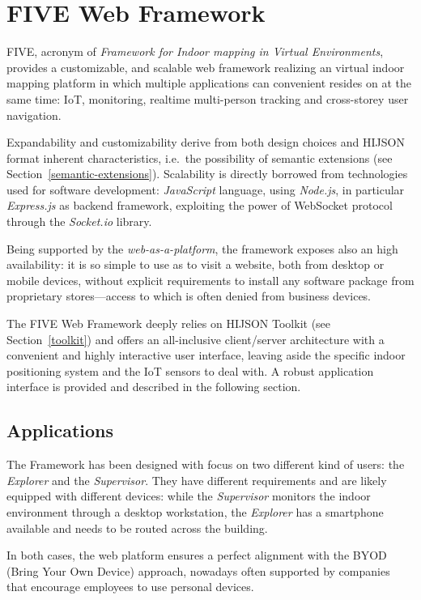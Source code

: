 \section{FIVE Web Framework}\label{framework}

FIVE, acronym of \emph{Framework for Indoor mapping in Virtual Environments},
provides a customizable, and scalable web framework realizing an virtual
indoor mapping platform in which multiple applications can convenient resides
on at the same time: IoT,  monitoring, realtime multi-person tracking and
cross-storey user navigation.

Expandability and customizability derive from both design choices and
HIJSON format inherent characteristics, i.e.~the possibility of semantic extensions (see Section~\ref{semantic-extensions}).
Scalability is directly borrowed from technologies used for
software development: \emph{JavaScript} language, using \emph{Node.js},
in particular \emph{Express.js} as backend framework, exploiting the
power of WebSocket protocol through the \emph{Socket.io} library.

Being supported by the \emph{web-as-a-platform}, the framework exposes
also an high availability: it is so simple to use as to visit a
website, both from desktop or mobile devices, without explicit
requirements to install any software package from proprietary stores---access to
which is often denied from business devices.

The FIVE Web Framework deeply relies on HIJSON Toolkit (see Section~\ref{toolkit}) and offers an
all-inclusive client/server architecture with a convenient and highly interactive
user interface, leaving aside the specific indoor positioning system and
the IoT sensors to deal with. A robust application interface is provided and
described in the following section.

\subsection{Applications}\label{applications}

The Framework has been designed with focus on two different kind of
users: the \emph{Explorer} and the \emph{Supervisor}. They have
different requirements and are likely equipped with different devices:
while the \emph{Supervisor} monitors the indoor environment through a
desktop workstation, the \emph{Explorer} has a smartphone available and
needs to be routed across the building.

In both cases, the web platform ensures a perfect alignment with the
BYOD (Bring Your Own Device) approach, nowadays often supported by companies
that encourage employees to use personal devices.


